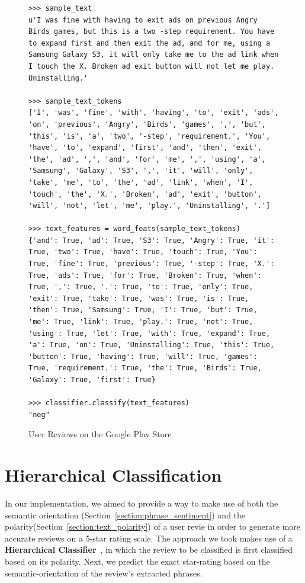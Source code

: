 \documentclass[11pt]{report} %
\begin{document}
\begin{figure}[h!]
  \centering
\begin{lstlisting}
>>> sample_text
u'I was fine with having to exit ads on previous Angry Birds games, but this is a two -step requirement. You have to expand first and then exit the ad, and for me, using a Samsung Galaxy S3, it will only take me to the ad link when I touch the X. Broken ad exit button will not let me play. Uninstalling.'

>>> sample_text_tokens
['I', 'was', 'fine', 'with', 'having', 'to', 'exit', 'ads', 'on', 'previous', 'Angry', 'Birds', 'games', ',', 'but', 'this', 'is', 'a', 'two', '-step', 'requirement.', 'You', 'have', 'to', 'expand', 'first', 'and', 'then', 'exit', 'the', 'ad', ',', 'and', 'for', 'me', ',', 'using', 'a', 'Samsung', 'Galaxy', 'S3', ',', 'it', 'will', 'only', 'take', 'me', 'to', 'the', 'ad', 'link', 'when', 'I', 'touch', 'the', 'X.', 'Broken', 'ad', 'exit', 'button', 'will', 'not', 'let', 'me', 'play.', 'Uninstalling', '.']

>>> text_features = word_feats(sample_text_tokens)
{'and': True, 'ad': True, 'S3': True, 'Angry': True, 'it': True, 'two': True, 'have': True, 'touch': True, 'You': True, 'fine': True, 'previous': True, '-step': True, 'X.': True, 'ads': True, 'for': True, 'Broken': True, 'when': True, ',': True, '.': True, 'to': True, 'only': True, 'exit': True, 'take': True, 'was': True, 'is': True, 'then': True, 'Samsung': True, 'I': True, 'but': True, 'me': True, 'link': True, 'play.': True, 'not': True, 'using': True, 'let': True, 'with': True, 'expand': True, 'a': True, 'on': True, 'Uninstalling': True, 'this': True, 'button': True, 'having': True, 'will': True, 'games': True, 'requirement.': True, 'the': True, 'Birds': True, 'Galaxy': True, 'first': True}

>>> classifier.classify(text_features)
"neg"

\end{lstlisting}
 \caption{User Reviews on the Google Play Store}
\label{fig:naivebayes_classifying_review}
\end{figure}

\section{Hierarchical Classification}
In our implementation, we aimed to provide a way to make use of both the semantic orientation (Section~\ref{section:phrase_sentiment}) and the polarity(Section~\ref{section:text_polarity}) of a user revie in order to generate more accurate reviews on a 5-star rating scale. The approach we took makes use of a \textbf{Hierarchical Classifier}~\cite{ruiz2002hierarchical,sun2001hierarchical}, in which the review to be classified is first classified based on its polarity. Next, we predict the exact star-rating based on the semantic-orientation of the review's extracted phrases.
\end{document}
